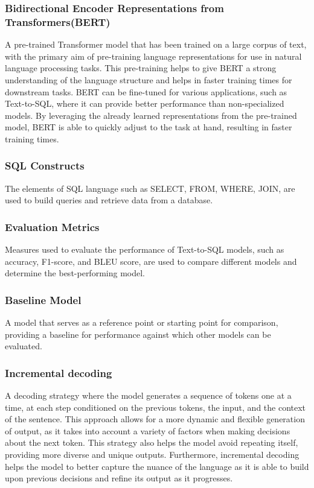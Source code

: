\subsubsection{Bidirectional Encoder Representations from Transformers(BERT)}

A pre-trained Transformer model that has been trained on a large corpus of text, with the primary aim of pre-training language representations for use in natural language processing tasks\cite{devlin-etal-2019-bert}. This pre-training helps to give BERT a strong understanding of the language structure and helps in faster training times for downstream tasks. BERT can be fine-tuned for various applications, such as Text-to-SQL, where it can provide better performance than non-specialized models. By leveraging the already learned representations from the pre-trained model, BERT is able to quickly adjust to the task at hand, resulting in faster training times.

\subsubsection{SQL Constructs}

The elements of SQL language such as SELECT, FROM, WHERE, JOIN, are used to build queries and retrieve data from a database.

\subsubsection{Evaluation Metrics}

Measures used to evaluate the performance of Text-to-SQL models, such as accuracy, F1-score, and BLEU score, are used to compare different models and determine the best-performing model.

\subsubsection{Baseline Model}

A model that serves as a reference point or starting point for comparison, providing a baseline for performance against which other models can be evaluated.

\subsubsection{Incremental decoding}

A decoding strategy where the model generates a sequence of tokens one at a time, at each step conditioned on the previous tokens, the input, and the context of the sentence. This approach allows for a more dynamic and flexible generation of output, as it takes into account a variety of factors when making decisions about the next token. This strategy also helps the model avoid repeating itself, providing more diverse and unique outputs. Furthermore, incremental decoding helps the model to better capture the nuance of the language as it is able to build upon previous decisions and refine its output as it progresses\cite{huang-mi-2010-efficient}.

